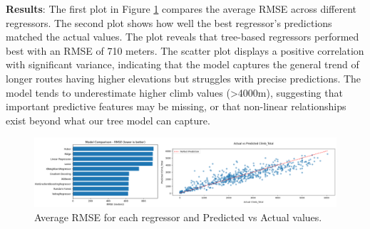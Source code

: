 \documentclass[a4paper, twoside]{article}
\begin{document}
\textbf{Results}:
The first plot in Figure \ref{fig:regressor1} compares the average RMSE across different regressors. The second plot shows how well the best regressor's predictions matched the actual values. The plot reveals that tree-based regressors performed best with an RMSE of 710 meters.
The scatter plot displays a positive correlation with significant variance, indicating that the model captures the general trend of longer routes having higher elevations but struggles with precise predictions.
The model tends to underestimate higher climb values (>4000m), suggesting that important predictive features may be missing, or that non-linear relationships exist beyond what our tree model can capture.
\begin{figure}[ht]
    \centering
    \includegraphics[width=1.0\textwidth]{assets/regressors1.png}
    \caption{Average RMSE for each regressor and Predicted vs Actual values.}
    \label{fig:regressor1}
\end{figure}
\end{document}
